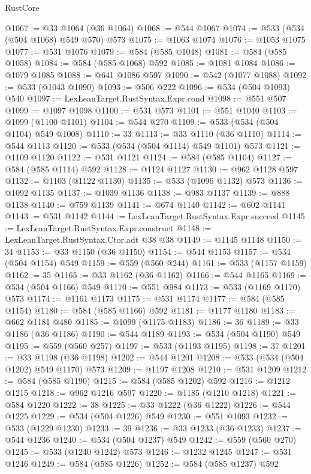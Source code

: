 \begin{lexlean}{RustCore}
\begin{coremodule}
@1067 := @33 @1064 (@36 @1064)
@1068 := @544 @1067
@1074 := @533 (@534 (@504 @1068) @549 @570) @573
@1075 := @1063 @1074
@1076 := @1053 @1075
@1077 := @531 @1076
@1079 := @584 (@585 @1048)
@1081 := @584 (@585 @1058)
@1084 := @584 (@585 @1068) @592
@1085 := @1081 @1084
@1086 := @1079 @1085
@1088 := @641 @1086 @597
@1090 := @542 (@1077 @1088)
@1092 := @533 (@1043 @1090)
@1093 := @506 @222
@1096 := @534 (@504 @1093) @540
@1097 := LexLeanTarget.RustSyntax.Expr.cond
@1098 := @551 @507
@1099 := @1097 @1098
@1100 := @531 @573
@1101 := @551 @1040
@1103 := @1099 (@1100 @1101)
@1104 := @544 @270
@1109 := @533 (@534 (@504 @1104) @549 @1008)
@1110 := 33
@1113 := @33 @1110 (@36 @1110)
@1114 := @544 @1113
@1120 := @533 (@534 (@504 @1114) @549 @1101) @573
@1121 := @1109 @1120
@1122 := @531 @1121
@1124 := @584 (@585 @1104)
@1127 := @584 (@585 @1114) @592
@1128 := @1124 @1127
@1130 := @962 @1128 @597
@1132 := @1103 (@1122 @1130)
@1135 := @533 (@1096 @1132) @573
@1136 := @1092 @1135
@1137 := @1039 @1136
@1138 := @983 @1137
@1139 := @888 @1138
@1140 := @759 @1139
@1141 := @674 @1140
@1142 := @602 @1141
@1143 := @531 @1142
@1144 := LexLeanTarget.RustSyntax.Expr.succeed
@1145 := LexLeanTarget.RustSyntax.Expr.construct
@1148 := LexLeanTarget.RustSyntax.Ctor.adt @38 @38
@1149 := @1145 @1148
@1150 := 34
@1153 := @33 @1150 (@36 @1150)
@1154 := @544 @1153
@1157 := @534 (@504 @1154) @549
@1159 := @559 (@560 @244)
@1161 := @533 (@1157 @1159)
@1162 := 35
@1165 := @33 @1162 (@36 @1162)
@1166 := @544 @1165
@1169 := @534 (@504 @1166) @549
@1170 := @551 @984
@1173 := @533 (@1169 @1170) @573
@1174 := @1161 @1173
@1175 := @531 @1174
@1177 := @584 (@585 @1154)
@1180 := @584 (@585 @1166) @592
@1181 := @1177 @1180
@1183 := @662 @1181 @480
@1185 := @1099 (@1175 @1183)
@1186 := 36
@1189 := @33 @1186 (@36 @1186)
@1190 := @544 @1189
@1193 := @534 (@504 @1190) @549
@1195 := @559 (@560 @257)
@1197 := @533 (@1193 @1195)
@1198 := 37
@1201 := @33 @1198 (@36 @1198)
@1202 := @544 @1201
@1208 := @533 (@534 (@504 @1202) @549 @1170) @573
@1209 := @1197 @1208
@1210 := @531 @1209
@1212 := @584 (@585 @1190)
@1215 := @584 (@585 @1202) @592
@1216 := @1212 @1215
@1218 := @962 @1216 @597
@1220 := @1185 (@1210 @1218)
@1221 := @584 @1220
@1222 := 38
@1225 := @33 @1222 (@36 @1222)
@1226 := @544 @1225
@1229 := @534 (@504 @1226) @549
@1230 := @551 @1093
@1232 := @533 (@1229 @1230)
@1233 := 39
@1236 := @33 @1233 (@36 @1233)
@1237 := @544 @1236
@1240 := @534 (@504 @1237) @549
@1242 := @559 (@560 @270)
@1245 := @533 (@1240 @1242) @573
@1246 := @1232 @1245
@1247 := @531 @1246
@1249 := @584 (@585 @1226)
@1252 := @584 (@585 @1237) @592

\end{coremodule}
\end{lexlean}
